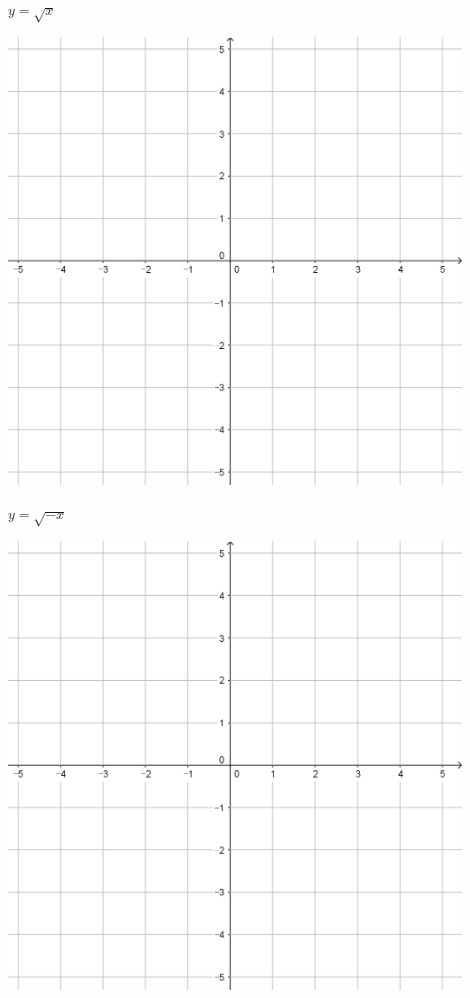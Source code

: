 \documentclass[a4paper]{oblivoir}
\begin{document}
\clearpage
\begin{minipage}{0.45\textwidth}\centering
\(y=\sqrt x\)
\par\bigskip\includegraphics[width=0.9\textwidth]{55}
\end{minipage}
\begin{minipage}{0.45\textwidth}\centering
\(y=\sqrt{-x}\)
\par\bigskip\includegraphics[width=0.9\textwidth]{55}
\end{minipage}\bigskip\bigskip\par
\end{document}
